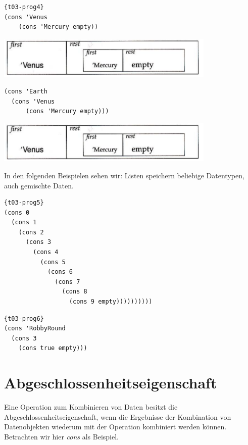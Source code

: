 \begin{lstlisting}{t03-prog4}
(cons 'Venus
    (cons 'Mercury empty))
\end{lstlisting}
\includegraphics[height=2cm]{Bilder/T03_01.png}

\begin{lstlisting}
(cons 'Earth
  (cons 'Venus
	  (cons 'Mercury empty)))
\end{lstlisting}
\includegraphics[height=2cm]{Bilder/T03_01.png}

In den folgenden Beispielen sehen wir: Listen speichern beliebige Datentypen, auch gemischte Daten.

\begin{lstlisting}{t03-prog5}
(cons 0
  (cons 1
    (cons 2
      (cons 3
        (cons 4
      	  (cons 5
            (cons 6
              (cons 7
                (cons 8
                  (cons 9 empty))))))))))
\end{lstlisting}

\begin{lstlisting}{t03-prog6}
(cons 'RobbyRound
  (cons 3
    (cons true empty)))
\end{lstlisting}
\section{Abgeschlossenheitseigenschaft}
Eine Operation zum Kombinieren von Daten besitzt die Abgeschlossenheitseigenschaft, wenn die Ergebnisse der Kombination von Datenobjekten wiederum mit der Operation kombiniert werden können. Betrachten wir hier \textit{cons} als Beispiel.
